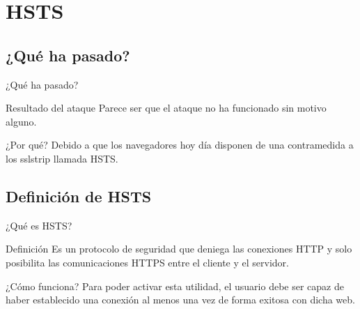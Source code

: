 \documentclass{beamer}
\begin{document}
\section{HSTS}
\subsection{¿Qué ha pasado?}
\begin{frame}{¿Qué ha pasado?}
	\begin{block}{Resultado del ataque}
		Parece ser que el ataque no ha funcionado sin motivo alguno.
	\end{block}
	\begin{alertblock}{¿Por qué?}
		Debido a que los navegadores hoy día disponen de una contramedida a los sslstrip llamada HSTS.
	\end{alertblock}	
\end{frame}

\subsection{Definición de HSTS}
\begin{frame}{¿Qué es HSTS?}
	\begin{block}{Definición}
		Es un protocolo de seguridad que deniega las conexiones HTTP y solo posibilita las comunicaciones HTTPS entre el cliente y el servidor.
	\end{block}
	\begin{block}{¿Cómo funciona?}
		 Para poder activar esta utilidad, el usuario debe ser capaz de haber establecido una conexión al menos una vez de forma exitosa con dicha web.
	\end{block}
\end{frame}
\end{document}
